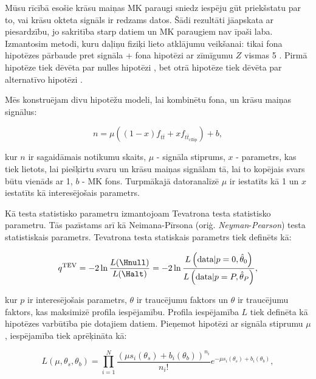 \label{subsec:hypo_testing}

Mūsu rīcībā esošie krāsu maiņas MK paraugi sniedz iespēju gūt priekšstatu par to, vai krāsu okteta \PW signāls ir redzams datos. Šādi rezultāti jāapskata ar piesardzību, jo sakritība starp datiem un MK paraugiem nav īpaši laba. Izmantosim metodi, kuru daļiņu fiziķi lieto atklājumu veikšanai: tikai fona hipotēzes pārbaude pret signāla + fona hipotēzi ar zīmīgumu $Z$ vismas 5 \cite{Cowan:2010js}. Pirmā hipotēze tiek dēvēta par nulles hipotēzi \Hnull, bet otrā hipotēze tiek dēvēta par alternatīvo hipotēzi \Halt.

Mēs konstruējam divu hipotēžu modeli, lai kombinētu fona, \ttbar un krāsu maiņas \ttbar signālus:

\begin{equation}
  n=\mu\left(\left(1-x\right)f_{t\overline{t}} + xf_{t\overline{t}_{\text{cflip}}}\right) + b,
  \label{eq:two_hypo_model}
\end{equation}

kur $n$ ir sagaidāmais notikumu skaits, $\mu$ - signāla stiprums, $x$  - parametrs, kas tiek lietots, lai piešķirtu svaru \ttbar un krāsu maiņas \ttbar signālam tā, lai to kopējais svars būtu vienāds ar 1, $b$ - MK fons. Turpmākajā datoranalīzē $\mu$ ir iestatīts kā 1 un $x$ iestatīts kā interesējošais parametrs.

Kā testa statistisko parametru izmantojoam Tevatrona testa statistisko parametru. Tās pazīstams arī kā Neimana-Pīrsona (oriģ. \textit{Neyman}-\textit{Pearson}) testa statistiskais parametrs. Tevatrona testa statiskais parametrs tiek definēts kā:

\begin{equation}
  q^{\text{TEV}}=-2\ln{\frac{L(\Hnull)}{L(\Halt)}}=-2\ln{\frac{L\left(\text{data}|p=0,\hat{\theta}_{0}\right)}{L\left(\text{data}|p=P,\hat{\theta}_{P}\right)}},
\end{equation}

kur $p$ ir interesējošais parametrs, $\theta$ ir traucējumu faktors un $\hat{\theta}$ ir traucējumu faktors, kas maksimizē profila iespējamību. Profila iespējamība $L$ tiek definēta kā hipotēzes varbūtība pie dotajiem datiem. Pieņemot hipotēzi ar signāla stiprumu $\mu$, iespējamība tiek aprēķināta kā:

\begin{equation}
  L(\mu, \theta_{s}, \theta_{b}) = \prod_{i=1}^{N}\frac{(\mu s_{i}(\theta_{s}) + b_{i}(\theta_{b}))^{n_{i}}}{n_{i}!}e^{-\mu s_{i}(\theta_{s}) + b_{i}(\theta_{b})},
\end{equation}

